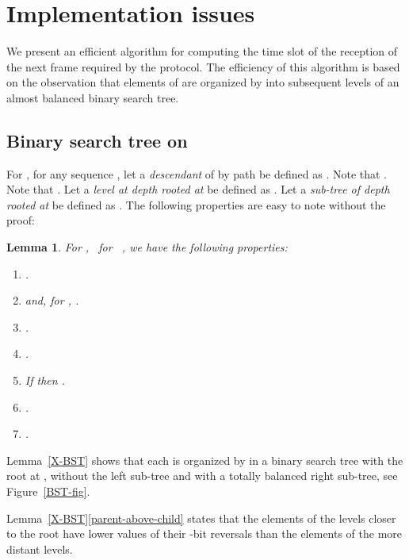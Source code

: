 \documentclass{article}
\newcommand{\tmem}[1]{{\em #1\/}}
\newenvironment{enumeratealpha}{\begin{enumerate}[a{\textup{)}}] }{\end{enumerate}}
\newtheorem{lemma}{Lemma}
\begin{document}
\section{\label{Section-implementation}Implementation issues}

We present an efficient algorithm for computing the time slot of the reception
of the next frame required by the protocol. The efficiency of this algorithm
is based on the observation that elements of  are organized by
 into subsequent levels of an almost balanced binary search
tree.

\subsection{Binary search tree on }

For , for any sequence ,
let a {\tmem{descendant}} of  by path  be defined as 
. 
Note that . Note that . Let a {\tmem{level at depth  rooted at }} be
defined as . Let
a {\tmem{sub-tree of depth  rooted at }} be defined as . The following properties are easy to note without the proof:

\begin{lemma}
  \label{BST-properties}For , \ for \ , we have the
  following properties:
  \begin{enumeratealpha}
    \item .
    
    \item \label{BST-L-ST} and,
    for , .
    
    \item .
    
    \item .
    
    \item \label{BST-with-right-ST}If  then .
    
    \item \label{BST-ST-root-ST} .
    
    \item \label{BST-inorder} .
  \end{enumeratealpha}
\end{lemma}

Lemma~\ref{X-BST} shows that each  is organized by 
in a binary search tree with the root at , without the left sub-tree and with a totally balanced right
sub-tree, see Figure~\ref{BST-fig}.

Lemma~\ref{X-BST}\ref{parent-above-child} states that the elements of the 
levels closer to the root
have lower values of their -bit reversals than 
the elements of the more distant levels.
\end{document}
